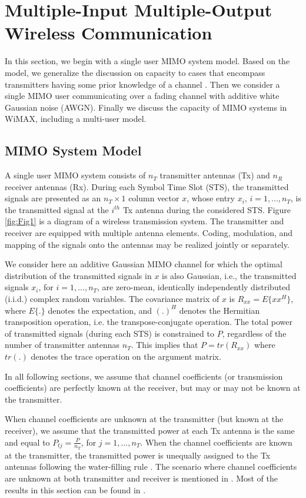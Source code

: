 \section{Multiple-Input Multiple-Output Wireless Communication}

In this section, we begin with a single user MIMO system model.
Based on the model, we generalize the discussion on capacity to
cases that encompass transmitters having some prior knowledge of a
channel \cite{9}. Then we consider a single MIMO user communicating
over a fading channel with additive white Gaussian noise (AWGN).
Finally we discuss the capacity of MIMO systems in WiMAX, including
a multi-user model.

\subsection{MIMO System Model}

A single user MIMO system consists of $n_{T}$ transmitter antennas
(Tx) and $n_{R}$ receiver antennas (Rx). During each Symbol Time
Slot (STS), the transmitted signals are presented as an
$n_{T}\times1$ column vector $x$, whose entry $x_{i}$,
$i=1,...,n_{T}$, is the transmitted signal at the $i^{th}$ Tx
antenna during the considered STS. Figure \ref{fig:Fig1} is a
diagram of a wireless transmission system. The transmitter and
receiver are equipped with multiple antenna elements. Coding,
modulation, and mapping of the signals onto the antennas may be
realized jointly or separately.

We consider here an additive Gaussian MIMO channel for which the
optimal distribution of the transmitted signals in $x$ is also
Gaussian, i.e., the transmitted signals $x_{i}$, for
$i=1,...,n_{T}$, are zero-mean, identically independently
distributed (i.i.d.) complex random variables. The covariance matrix
of $x$ is $R_{xx}=E\{xx^{H}\}$, where $E\{.\}$ denotes the
expectation, and $(.)^{H}$ denotes the Hermitian transposition
operation, i.e. the transpose-conjugate operation. The total power
of transmitted signals (during each STS) is constrained to $P$,
regardless of the number of transmitter antennas $n_{T}$. This
implies that $P=tr(R_{xx})$ where $tr(.)$ denotes the trace
operation on the argument matrix.

In all following sections, we assume that channel coefficients (or
transmission coefficients) are perfectly known at the receiver, but
may or may not be known at the transmitter.

When channel coefficients are unknown at the transmitter (but known
at the receiver), we assume that the transmitted power at each Tx
antenna is the same and equal to $P_{tj}=\frac{P}{n_{T}}$, for
$j=1,...,n_{T}$. When the channel coefficients are known at the
transmitter, the transmitted power is unequally assigned to the Tx
antennas following the water-filling rule \cite{13}. The scenario
where channel coefficients are unknown at both transmitter and
receiver is mentioned in \cite{12}. Most of the results in this
section can be found in \cite{30}.

